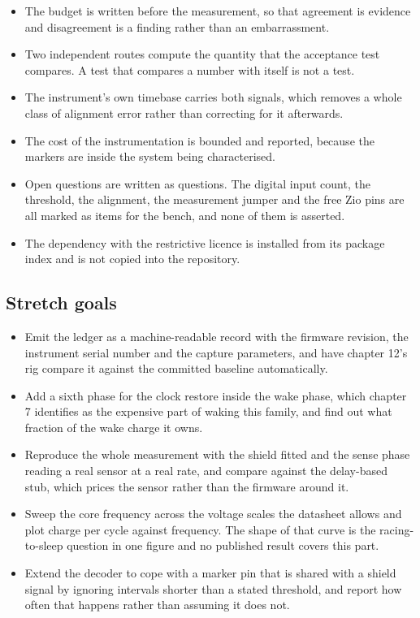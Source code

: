 \begin{itemize}
\item The budget is written before the measurement, so that agreement is
evidence and disagreement is a finding rather than an embarrassment.
\item Two independent routes compute the quantity that the acceptance test
compares. A test that compares a number with itself is not a test.
\item The instrument's own timebase carries both signals, which removes a whole
class of alignment error rather than correcting for it afterwards.
\item The cost of the instrumentation is bounded and reported, because the
markers are inside the system being characterised.
\item Open questions are written as questions. The digital input count, the
threshold, the alignment, the measurement jumper and the free Zio pins are all
marked as items for the bench, and none of them is asserted.
\item The dependency with the restrictive licence is installed from its package
index and is not copied into the repository.
\end{itemize}

\subsection*{Stretch goals}

\begin{itemize}
\item Emit the ledger as a machine-readable record with the firmware revision,
the instrument serial number and the capture parameters, and have chapter 12's
rig compare it against the committed baseline automatically.
\item Add a sixth phase for the clock restore inside the wake phase, which
chapter 7 identifies as the expensive part of waking this family, and find out
what fraction of the wake charge it owns.
\item Reproduce the whole measurement with the shield fitted and the sense phase
reading a real sensor at a real rate, and compare against the delay-based stub,
which prices the sensor rather than the firmware around it.
\item Sweep the core frequency across the voltage scales the datasheet allows
and plot charge per cycle against frequency. The shape of that curve is the
racing-to-sleep question in one figure and no published result covers this part.
\item Extend the decoder to cope with a marker pin that is shared with a shield
signal by ignoring intervals shorter than a stated threshold, and report how
often that happens rather than assuming it does not.
\end{itemize}

